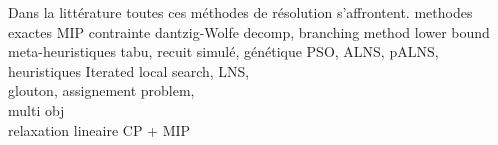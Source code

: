 Dans la littérature toutes ces méthodes de résolution s'affrontent. 
methodes exactes MIP contrainte dantzig-Wolfe decomp, branching method lower bound\\
meta-heuristiques tabu, recuit simulé, génétique PSO, ALNS, pALNS, \\
heuristiques Iterated local search, LNS,\\
glouton, assignement problem,\\
multi obj\\
relaxation lineaire CP + MIP\\